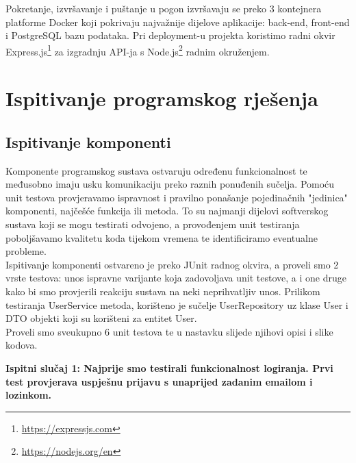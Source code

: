 Pokretanje, izvršavanje i puštanje u pogon izvršavaju se preko 3 kontejnera platforme Docker koji pokrivaju najvažnije dijelove aplikacije: back-end, front-end i PostgreSQL bazu podataka. Pri deployment-u projekta koristimo radni okvir Express.js\footnote{\url{https://expressjs.com}} za izgradnju API-ja s Node.js\footnote{\url{https://nodejs.org/en}} radnim okruženjem.

			
			\eject 
		
	
		\section{Ispitivanje programskog rješenja}
	
			
			\subsection{Ispitivanje komponenti}
			
			Komponente programskog sustava ostvaruju određenu funkcionalnost te međusobno imaju usku komunikaciju preko raznih ponuđenih sučelja. Pomoću unit testova provjeravamo ispravnost i pravilno ponašanje pojedinačnih "jedinica" komponenti, najčešće funkcija ili metoda. To su najmanji dijelovi softverskog sustava koji se mogu testirati odvojeno, a provođenjem unit testiranja poboljšavamo kvalitetu koda tijekom vremena te identificiramo eventualne probleme. \\
			
Ispitivanje komponenti ostvareno je preko JUnit radnog okvira, a proveli smo 2 vrste testova: unos ispravne varijante koja zadovoljava unit testove, a i one druge kako bi smo provjerili reakciju sustava na neki neprihvatljiv unos.  Prilikom testiranja UserService metoda, korišteno je sučelje UserRepository uz klase User i DTO objekti koji su korišteni za entitet User.\\
Proveli smo sveukupno 6 unit testova te u nastavku slijede njihovi opisi i slike kodova.

\pagebreak

\textbf{Ispitni slučaj 1: Najprije smo testirali funkcionalnost logiranja. Prvi test provjerava uspješnu prijavu s unaprijed zadanim emailom i lozinkom.}

